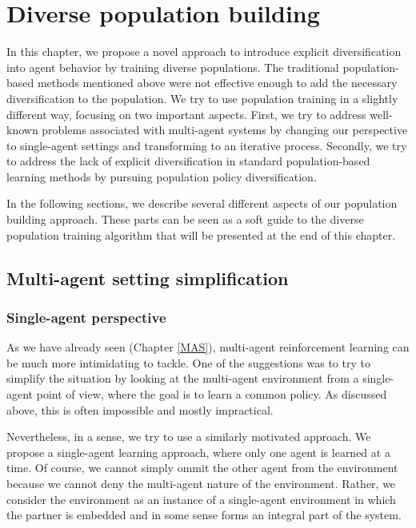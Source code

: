 \chapter{Diverse population building}\label{DiversePopulationMethodChapter}
In this chapter, we propose a novel approach to introduce explicit diversification into agent behavior by training diverse populations.
The traditional population-based methods mentioned above were not effective enough to add the necessary diversification to the population.
We try to use population training in a slightly different way, focusing on two important aspects.
First, we try to address well-known problems associated with multi-agent systems by changing our perspective to single-agent settings and transforming to an iterative process.
Secondly, we try to address the lack of explicit diversification in standard population-based learning methods by pursuing population policy diversification.

In the following sections, we describe several different aspects of our population building approach.
These parts can be seen as a soft guide to the diverse population training algorithm that will be presented at the end of this chapter.

\section{Multi-agent setting simplification}

\subsection{Single-agent perspective}
As we have already seen (Chapter \ref{MAS}), multi-agent reinforcement learning can be much more intimidating to tackle.
One of the suggestions was to try to simplify the situation by looking at the multi-agent environment from a single-agent point of view, where the goal is to learn a common policy.
As discussed above, this is often impossible and mostly impractical.

Nevertheless, in a sense, we try to use a similarly motivated approach.
We propose a single-agent learning approach, where only one agent is learned at a time.
Of course, we cannot simply ommit the other agent from the environment because we cannot deny the multi-agent nature of the environment.
Rather, we consider the environment as an instance of a single-agent environment in which the partner is embedded and in some sense forms an integral part of the system.

